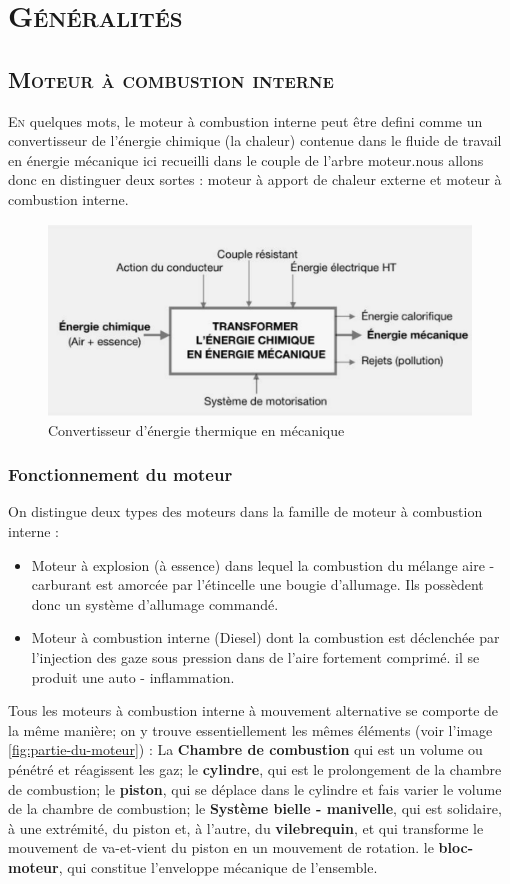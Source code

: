 \chapter{\textsc{Généralités}}
\section{\textsc{Moteur à combustion interne}}
\lettrine{E}{n} quelques mots, le moteur à combustion interne peut être defini comme un convertisseur de l'énergie chimique (la chaleur) contenue dans le fluide de travail en énergie mécanique ici recueilli dans le couple de l'arbre moteur.nous allons donc en distinguer deux sortes : moteur à apport de chaleur externe et moteur à combustion interne.\cite{sumuna}
\begin{figure}[h]
	\centering
	\includegraphics[width=0.7\linewidth]{Img/convertisseur}
	\caption[Convertisseur]{Convertisseur d'énergie thermique en mécanique}
	\label{fig:convertisseur}
\end{figure}

\subsection{Fonctionnement du moteur}
On distingue deux types des moteurs dans la famille de moteur à combustion interne :
\begin{itemize}
	\item Moteur à explosion (à essence) dans lequel la combustion du mélange aire - carburant est amorcée par l'étincelle une bougie d'allumage. Ils possèdent donc un système d'allumage commandé.\cite{tecauto}
	\item Moteur à combustion interne (Diesel) dont la combustion est déclenchée par l'injection des gaze sous pression dans de l'aire fortement comprimé. il se produit une auto - inflammation.\cite{tecauto}
\end{itemize}


Tous les moteurs à combustion interne à mouvement alternative se comporte de la même manière; on y trouve essentiellement les mêmes éléments (voir l'image \ref{fig:partie-du-moteur}) : La \textbf{Chambre de combustion} qui est un volume ou pénétré et réagissent les gaz; le \textbf{cylindre}, qui est le prolongement de la chambre de combustion; le \textbf{piston}, qui se déplace dans le cylindre et fais varier le volume de la chambre de combustion; le \textbf{Système bielle - manivelle}, qui est solidaire, à une extrémité, du piston et, à l’autre, du \textbf{vilebrequin}, et qui transforme le mouvement de va-et-vient du piston en un mouvement de rotation. le \textbf{bloc-moteur}, qui constitue l’enveloppe mécanique de l’ensemble.\cite{approche}


